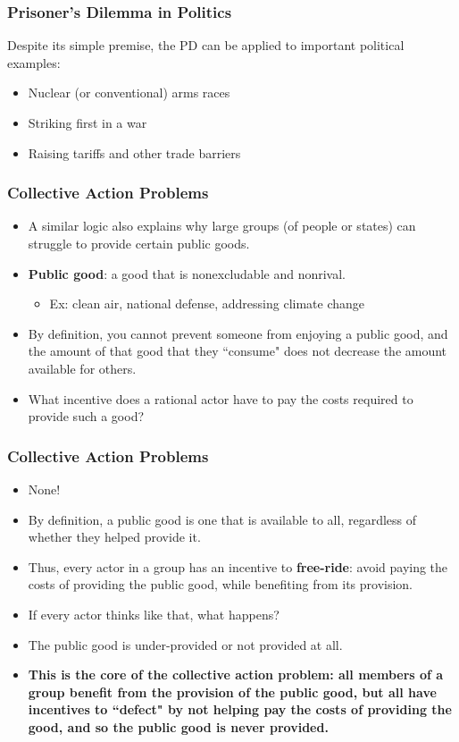 \documentclass[handout]{beamer}
\begin{document}
\begin{frame} 
	\frametitle{\LARGE{Prisoner's Dilemma in Politics}}
	Despite its simple premise, the PD can be applied to important political examples:
	\begin{itemize}
		\item Nuclear (or conventional) arms races \pause
		\item Striking first in a war \pause
		\item Raising tariffs and other trade barriers 
	\end{itemize}
\end{frame}

\begin{frame} 
	\frametitle{\LARGE{Collective Action Problems}}
	\begin{itemize}
		\item A similar logic also explains why large groups (of people or states) can struggle to provide certain public goods. \pause
		\item \textbf{Public good}: a good that is nonexcludable and nonrival.
		\begin{itemize}
			\item Ex: clean air, national defense, addressing climate change \pause
		\end{itemize} 
		\item By definition, you cannot prevent someone from enjoying a public good, and the amount of that good that they ``consume" does not decrease the amount available for others. \pause
		\item What incentive does a rational actor have to pay the costs required to provide such a good?
	\end{itemize}
\end{frame}

\begin{frame} 
	\frametitle{\LARGE{Collective Action Problems}}
	\begin{itemize}
		\item None! \pause
		\item By definition, a public good is one that is available to all, regardless of whether they helped provide it. \pause
		\item Thus, every actor in a group has an incentive to \textbf{free-ride}: avoid paying the costs of providing the public good, while benefiting from its provision. \pause
		\item If every actor thinks like that, what happens? \pause
		\item The public good is under-provided or not provided at all. \pause
		\item \textbf{This is the core of the collective action problem: all members of a group benefit from the provision of the public good, but all have incentives to ``defect" by not helping pay the costs of providing the good, and so the public good is never provided.}
	\end{itemize}
\end{frame}
\end{document}
